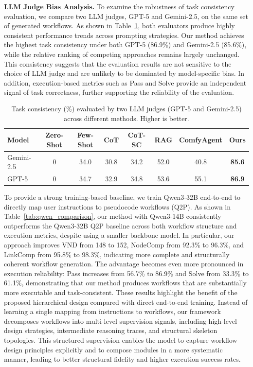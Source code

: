 \documentclass[runningheads]{llncs}
\begin{document}
\noindent \textbf{LLM Judge Bias Analysis.} To examine the robustness of task consistency evaluation, we compare two LLM judges, GPT-5 and Gemini-2.5, on the same set of generated workflows. 
As shown in Table~\ref{tab:task_consistency}, both evaluators produce highly consistent performance trends across prompting strategies. 
Our method achieves the highest task consistency under both GPT-5 (86.9\%) and Gemini-2.5 (85.6\%), while the relative ranking of competing approaches remains largely unchanged. 
This consistency suggests that the evaluation results are not sensitive to the choice of LLM judge and are unlikely to be dominated by model-specific bias. 
In addition, execution-based metrics such as Pass and Solve provide an independent signal of task correctness, further supporting the reliability of the evaluation.

\begin{table}[ht]
\centering
\caption{Task consistency (\%) evaluated by two LLM judges (GPT-5 and Gemini-2.5) across different methods. Higher is better.}
\label{tab:task_consistency}

\small
\setlength{\tabcolsep}{4pt}

\begin{tabular}{lccccccc}
\toprule
Model
& Zero-Shot
& Few-Shot
& CoT
& CoT-SC
& RAG
& ComfyAgent
& Ours \\
\midrule
Gemini-2.5
& 0
& 34.0
& 30.8
& 34.2
& 52.0
& 40.8
& \textbf{85.6} \\

GPT-5
& 0
& 34.7
& 32.9
& 34.8
& 53.6
& 55.1
& \textbf{86.9} \\
\bottomrule
\end{tabular}
\end{table}


To provide a strong training-based baseline, we train Qwen3-32B end-to-end to directly map user instructions to pseudocode workflows (Q2P).  As shown in Table~\ref{tab:qwen_comparison}, our method with Qwen3-14B consistently outperforms the Qwen3-32B Q2P baseline across both workflow structure and execution metrics, despite using a smaller backbone model.  In particular, our approach improves VND from 148 to 152, NodeComp from 92.3\% to 96.3\%, and LinkComp from 95.8\% to 98.3\%, indicating more complete and structurally coherent workflow generation.  The advantage becomes even more pronounced in execution reliability: Pass increases from 56.7\% to 86.9\% and Solve from 33.3\% to 61.1\%, demonstrating that our method produces workflows that are substantially more executable and task-consistent. These results highlight the benefit of the proposed hierarchical design compared with direct end-to-end training.  Instead of learning a single mapping from instructions to workflows, our framework decomposes workflows into multi-level supervision signals, including high-level design strategies, intermediate reasoning traces, and structural skeleton topologies. 
This structured supervision enables the model to capture workflow design principles explicitly and to compose modules in a more systematic manner, leading to better structural fidelity and higher execution success rates.
\end{document}
